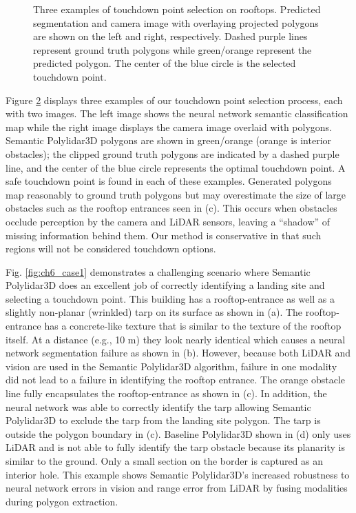 \begin{figure}[!t]
\begin{subfigure}{.32\linewidth}
    \caption{\label{fig:ch6_qualitative_d}}
  \end{subfigure}
  \caption[Three examples of touchdown point selection on rooftops]{Three examples of touchdown point selection on rooftops. Predicted segmentation and camera image with overlaying projected polygons are shown on the left and right, respectively. Dashed purple lines represent ground truth polygons while green/orange represent the predicted polygon. The center of the blue circle is the selected touchdown point.     }\label{fig:ch6_qualitative}
\end{figure}

Figure \ref{fig:ch6_qualitative} displays three examples of our touchdown point selection process, each with two images. The left image shows the neural network semantic classification map while the right image displays the camera image overlaid with polygons.  Semantic Polylidar3D polygons are shown in green/orange (orange is interior obstacles); the clipped ground truth polygons are indicated by a dashed purple line, and the center of the blue circle represents the optimal touchdown point. A safe touchdown point is found in each of these examples.  Generated polygons map reasonably to ground truth polygons but may overestimate the size of large obstacles such as the rooftop entrances seen in (c). This occurs when obstacles occlude perception by the camera and LiDAR sensors, leaving a ``shadow'' of missing information behind them. Our method is conservative in that such regions will not be considered touchdown options. 

Fig. \ref{fig:ch6_case1} demonstrates a challenging scenario where Semantic Polylidar3D does an excellent job of correctly identifying a landing site and selecting a touchdown point. This building has a rooftop-entrance as well as a slightly non-planar (wrinkled) tarp on its surface as shown in (a). The rooftop-entrance has a concrete-like texture that is similar to the texture of the rooftop itself. At a distance (e.g., 10 m) they look nearly identical which causes a neural network segmentation failure as shown in (b). However, because both LiDAR and vision are used in the Semantic Polylidar3D algorithm,  failure in one modality did not lead to a failure in identifying the rooftop entrance. The orange obstacle line fully encapsulates the rooftop-entrance as shown in (c). In addition, the neural network was able to correctly identify the tarp allowing Semantic Polylidar3D to exclude the tarp from the landing site polygon. The tarp is outside the polygon boundary in (c). Baseline Polylidar3D shown in (d) only uses LiDAR and is not able to fully identify the tarp obstacle because its planarity is similar to the ground. Only a small section on the border is captured as an interior hole. This example shows Semantic Polylidar3D's increased robustness to neural network errors in vision and range error from LiDAR by fusing modalities during polygon extraction. 

